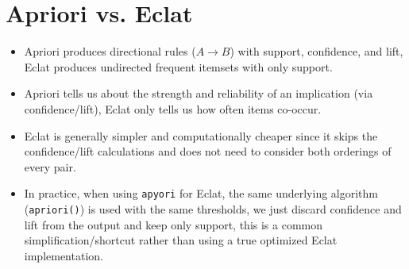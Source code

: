 \documentclass[conference]{IEEEtran}
\begin{document}
\section*{Apriori vs. Eclat}
\begin{itemize}
    \item Apriori produces directional rules ($A \rightarrow B$) with support, confidence, and lift, Eclat produces undirected frequent itemsets with only support.
    \item Apriori tells us about the strength and reliability of an implication (via confidence/lift), Eclat only tells us how often items co-occur.
    \item Eclat is generally simpler and computationally cheaper since it skips the confidence/lift calculations and does not need to consider both orderings of every pair.
    \item In practice, when using \texttt{apyori} for Eclat, the same underlying algorithm (\texttt{apriori()}) is used with the same thresholds, we just discard confidence and lift from the output and keep only support, this is a common simplification/shortcut rather than using a true optimized Eclat implementation.
\end{itemize}
\end{document}
